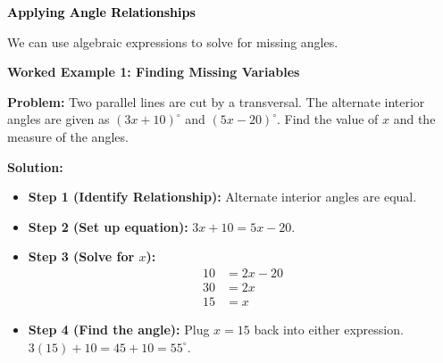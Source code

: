 \documentclass[12pt, letterpaper, fleqn]{article}
\begin{document}
\vspace{4mm}

\newpage

\begin{tcolorbox}[colback=customteal!20]
\large\textcolor{black}{\textbf{Applying Angle Relationships}}
\end{tcolorbox}

\noindent
We can use algebraic expressions to solve for missing angles.

\vspace{3mm}

\begin{tcolorbox}[colback=white, colframe=black!25, boxrule=0.6pt, arc=4mm, left=6mm, right=6mm, top=5mm, bottom=5mm]

\textbf{Worked Example 1: Finding Missing Variables}

\medskip

\textbf{Problem:} Two parallel lines are cut by a transversal. The alternate interior angles are given as $(3x + 10)^\circ$ and $(5x - 20)^\circ$. Find the value of $x$ and the measure of the angles.

\medskip

\textbf{Solution:}
\begin{itemize}
    \item \textbf{Step 1 (Identify Relationship):} Alternate interior angles are equal.
    \item \textbf{Step 2 (Set up equation):} $3x + 10 = 5x - 20$.
    \item \textbf{Step 3 (Solve for $x$):} 
    \begin{align*}
        10 &= 2x - 20 \\
        30 &= 2x \\
        15 &= x
    \end{align*}
    \item \textbf{Step 4 (Find the angle):} Plug $x=15$ back into either expression. $3(15) + 10 = 45 + 10 = 55^\circ$.
\end{itemize}

\end{tcolorbox}

\vspace{4mm}
\end{document}
